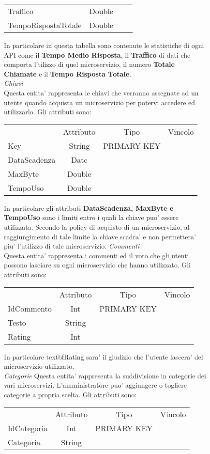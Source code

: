{{\begin{figure}[ht]
\begin{center}
\begin{tabular}{lccc}
				Traffico&Double& \\
				TempoRispostaTotale&Double& \\
			\end{tabular}
			\end{center}
			In particolare in questa tabella sono contenute le statistiche di ogni API come il \textbf{Tempo Medio Risposta}, il \textbf{Traffico} di dati che comporta l'tilizzo di quel microservizio, il numero \textbf{Totale Chiamate} e il \textbf{Tempo Risposta Totale}. \\
			\textit{Chiavi}\\
			Questa entita' rappresenta le chiavi che verranno assegnate ad un utente quando acquista un microservizio per potervi accedere ed utilizzarlo. Gli attributi sono: \\
			\begin{center}
			\begin{tabular}{lccc}
				&Attributo&Tipo&Vincolo\\
				Key&String&PRIMARY KEY\\
				DataScadenza&Date& \\
				MaxByte&Double& \\
				TempoUso&Double& \\
			\end{tabular}
			\end{center}
			In particolare gli attributi \textbf{DataScadenza, MaxByte e TempoUso} sono i limiti entro i quali la chiave puo' essere utilizzata. Secondo la policy di acquisto di un microservizio, al raggiungimento di tale limite la chiave scadra' e non permettera' piu' l'utilizzo di tale microservizio.
			\textit{Commenti}\\
			Questa entita' rappresenta i commenti ed il voto  che gli utenti possono lasciare su ogni microservizio che hanno utilizzato. Gli attributi sono:
			\begin{center}
			\begin{tabular}{lccc}
				&Attributo&Tipo&Vincolo\\
				IdCommento&Int&PRIMARY KEY\\
				Testo&String& \\
				Rating&Int& \\
			\end{tabular}
			\end{center}
			In particolare textbf{Rating} sara' il giudizio che l'utente lascera' del microservizio utilizzato. \\
			
			\textit{Categorie}
			Questa entita' rappresenta la suddivisione in categorie dei vari microservizi. L'amministratore puo' aggiungere o togliere categorie a propria scelta. Gli attributi sono: 
			\begin{center}
			\begin{tabular}{lccc}
				&Attributo&Tipo&Vincolo\\
				IdCategoria&Int&PRIMARY KEY\\
				Categoria&String& \\			
			\end{tabular}
			\end{center}\\
			

\end{figure}}}

